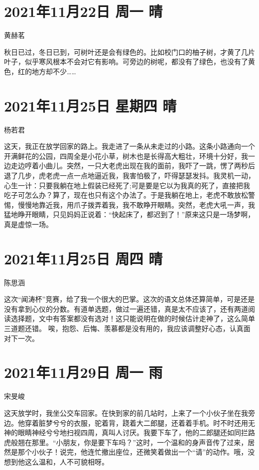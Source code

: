 \section{2021年11月22日 周一 晴}

黄赫茗

秋日已过，冬日已到，可树叶还是会有绿色的。比如校门口的柚子树，才黄了几片叶子，似乎寒风根本不会对它有影响。可旁边的树呢，都没有了绿色，也没有了黄色，红的地方却不少……

\section{2021年11月25日 星期四 晴}

杨若君

这天，我正在放学回家的路上。我走进了一条从未走过的小路。这条小路通向一个开满鲜花的公园，四周全是小花小草，树木也是长得高大粗壮，环境十分好，我一边走边哼着小曲儿。突然，一只大老虎出现在我的面前，我吓了一跳，愣了两秒后退了几步，虎老虎一点一点地逼近我，我害怕极了，吓得瑟瑟发抖。我灵机一动，心生一计：只要我躺在地上假装已经死了;可是要是它以为我真的死了，直接把我吃子可怎么办？算了，现在也只有这个办法了。于是我躺在地上，老虎不敢放松警惕，慢慢地靠近我，用爪子拨弄着我，我不敢睁开眼睛。突然，老虎大吼一声，我猛地睁开眼睛，只见妈妈正说着：“快起床了，都迟到了！”原来这只是一场梦啊，真是虚惊一场。

\section{2021年11月25日 周四 晴}

陈思涵

这次“闻涛杯”竞赛，给了我一个很大的巴掌。这次的语文总体还算简单，可是还是没有拿到心仪的分数。有道单选题，做过一遍还错，真是太不应该了，还有两道阅读选择题，文中有答案都没有选对！这只能说明在做的时候估计走神了，这么简单三道题还错。
唉，抱怨、后悔、羡慕都是没有用的，我应该调整好心态，认真面对下一次。

\section{2021年11月29日 周一 雨}

宋旻峻

这天放学时，我坐公交车回家。在快到家的前几站时，上来了一个小伙子坐在我旁边。他穿着脏梦兮兮的衣服，驼着背，跷着大二郎腿，还着着手机。时不时还用无神的眼睛神经兮兮地扫视四周，真叫人讨厌。我要下车了，他的二郎腿还如同拦路虎般翘在那里。“小朋友，你是要下车吗？”这时，一个温和的身声音传了过来，居然是那个小伙子！说完，他连忙撤出座位，还微笑着做出一个“请”的动作。哦，没想到他这么温和，人不可貌相呀。

